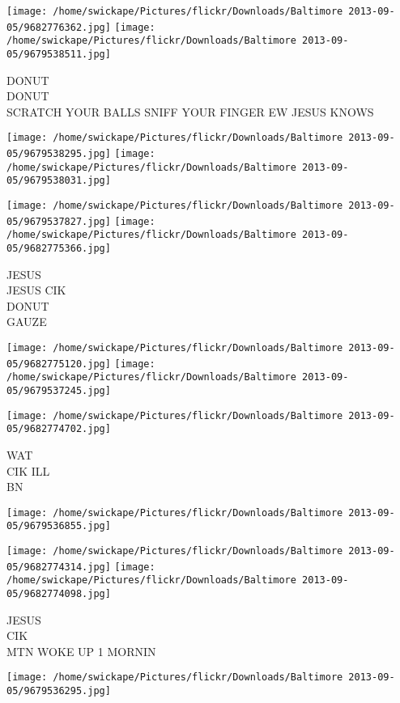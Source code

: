 \documentclass[10pt,letterpaper]{article}
\begin{document}
\vspace{0.25in}
\texttt{[image: /home/swickape/Pictures/flickr/Downloads/Baltimore 2013-09-05/9682776362.jpg]}
\texttt{[image: /home/swickape/Pictures/flickr/Downloads/Baltimore 2013-09-05/9679538511.jpg]}

DONUT\\
DONUT\\
SCRATCH YOUR BALLS SNIFF YOUR FINGER EW JESUS KNOWS
\pagebreak

\texttt{[image: /home/swickape/Pictures/flickr/Downloads/Baltimore 2013-09-05/9679538295.jpg]}
\texttt{[image: /home/swickape/Pictures/flickr/Downloads/Baltimore 2013-09-05/9679538031.jpg]}

\texttt{[image: /home/swickape/Pictures/flickr/Downloads/Baltimore 2013-09-05/9679537827.jpg]}
\texttt{[image: /home/swickape/Pictures/flickr/Downloads/Baltimore 2013-09-05/9682775366.jpg]}

JESUS\\
JESUS CIK\\
DONUT\\
GAUZE
\pagebreak

\texttt{[image: /home/swickape/Pictures/flickr/Downloads/Baltimore 2013-09-05/9682775120.jpg]}
\texttt{[image: /home/swickape/Pictures/flickr/Downloads/Baltimore 2013-09-05/9679537245.jpg]}

\vspace{0.25in}
\texttt{[image: /home/swickape/Pictures/flickr/Downloads/Baltimore 2013-09-05/9682774702.jpg]}

WAT\\
CIK ILL\\
BN
\pagebreak

\texttt{[image: /home/swickape/Pictures/flickr/Downloads/Baltimore 2013-09-05/9679536855.jpg]}

\vspace{0.25in}
\texttt{[image: /home/swickape/Pictures/flickr/Downloads/Baltimore 2013-09-05/9682774314.jpg]}
\texttt{[image: /home/swickape/Pictures/flickr/Downloads/Baltimore 2013-09-05/9682774098.jpg]}

JESUS\\
CIK\\
MTN WOKE UP 1 MORNIN
\pagebreak

\texttt{[image: /home/swickape/Pictures/flickr/Downloads/Baltimore 2013-09-05/9679536295.jpg]}
\end{document}

